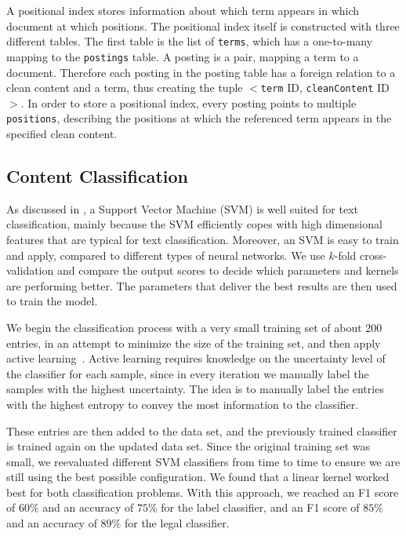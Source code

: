 \documentclass[USenglish,oneside,twocolumn]{article}
\begin{document}
A positional index stores information about which term appears in which document at which positions. The positional index itself is constructed with three different tables. The first table is the list of \texttt{terms}, which has a one-to-many mapping to the \texttt{postings} table. A posting is a pair, mapping a term to a document. Therefore each posting in the posting table has a foreign relation to a clean content and a term, thus creating the tuple $<$\texttt{term} ID, \texttt{cleanContent} ID$>$. In order to store a positional index, every posting points to multiple \texttt{positions}, describing the positions at which the referenced term appears in the specified clean content.

%
%
\subsection{Content Classification}
As discussed in \cite{Nabki2017, Verma2013}, a Support Vector Machine (SVM) is well suited for text classification, mainly because the SVM efficiently copes with high dimensional features that are typical for text classification. Moreover, an SVM is easy to train and apply, compared to different types of neural networks. We use $k$-fold cross-validation and compare the output scores to decide which parameters and kernels are performing better. The parameters that deliver the best results are then used to train the model.

We begin the classification process with a very small training set of about $200$ entries, in an attempt to minimize the size of the training set, and then apply active learning~\cite{Xu2009}. 
Active learning requires knowledge on the uncertainty level of the classifier for each sample, since in every iteration we manually label the samples with the highest uncertainty. The idea is to  manually label the entries with the highest entropy to convey the most information to the classifier.
 
 These entries are then added to the data set, and the previously trained classifier is trained again on the updated data set. Since the original training set was small, we reevaluated different SVM classifiers from time to time to ensure we are still using the best possible configuration. We found that a linear kernel worked best for both classification problems. With this approach, we reached an F1 score of $60\%$ and an accuracy of $75\%$ for the label classifier, and an F1 score of $85\%$ and an accuracy of $89\%$ for the legal classifier.
\end{document}
